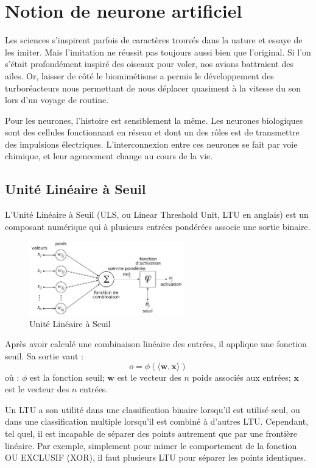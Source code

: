 \section{Notion de neurone artificiel}
Les sciences s'inspirent parfois de caractères trouvés dans la nature et essaye de les imiter. Mais l'imitation ne réussit pas toujours aussi bien que l'original. Si l'on s'était profondément inspiré des oiseaux pour voler, nos avions battraient des ailes. Or, laisser de côté le biomimétisme a permis le développement des turboréacteurs nous permettant de nous déplacer quasiment à la vitesse du son lors d'un voyage de routine.

Pour les neurones, l'histoire est sensiblement la même. Les neurones biologiques sont des cellules fonctionnant en réseau et dont un des rôles est de transmettre des impulsions électriques. L'interconnexion entre ces neurones se fait par voie chimique, et leur agencement change au cours de la vie.

\subsection{Unité Linéaire à Seuil}
L'Unité Linéaire à Seuil (ULS, ou Linear Threshold Unit, LTU en anglais) est un composant numérique qui à plusieurs entrées pondérées associe une sortie binaire.

\begin{figure}
\centering
\includegraphics[width=0.6\textwidth]{img/ltu.png}
\caption{Unité Linéaire à Seuil}
\label{fig:ltu}
\end{figure}

Après avoir calculé une combinaison linéaire des entrées, il applique une fonction seuil. Sa sortie vaut :
\[o = \phi(\langle \boldsymbol{w}, \boldsymbol{x} \rangle)\]
où : \(\phi\) est la fonction seuil; \(\boldsymbol{w}\) est le vecteur des \(n\) poids associés aux entrées; \(\boldsymbol{x}\) est le vecteur des \(n\) entrées.

Un LTU a son utilité dans une classification binaire lorsqu'il est utilisé seul, ou dans une classification multiple lorsqu'il est combiné à d'autres LTU. Cependant, tel quel, il est incapable de séparer des points autrement que par une frontière linéaire. Par exemple, simplement pour mimer le comportement de la fonction OU EXCLUSIF (XOR), il faut plusieurs LTU pour séparer les points identiques.

